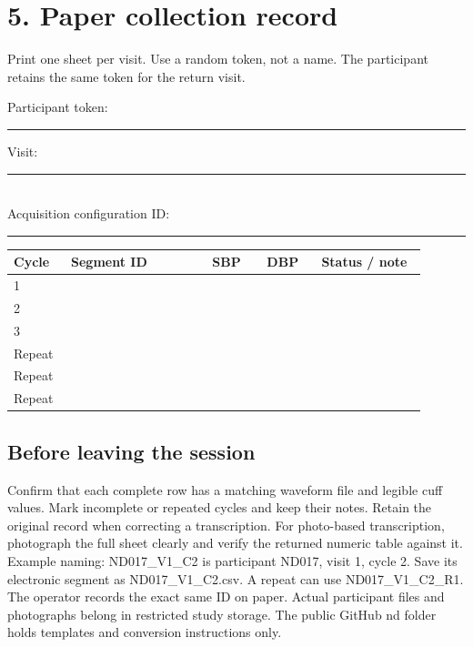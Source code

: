 \documentclass[11pt,letterpaper]{article}
\renewcommand{\arraystretch}{1.22}
\begin{document}
\section*{5. Paper collection record}
Print one sheet per visit. Use a random token, not a name. The participant retains the same token for the return visit.
\par
Participant token: \rule{4cm}{0.4pt} \quad Visit: \rule{1.5cm}{0.4pt}\\
Acquisition configuration ID: \rule{7cm}{0.4pt}
\vspace{8pt}
\renewcommand{\arraystretch}{2.7}

\par\smallskip
\begin{tabular}{@{}p{0.12\linewidth}p{0.31\linewidth}p{0.12\linewidth}p{0.12\linewidth}p{0.23\linewidth}@{}}\toprule
Cycle & Segment ID & SBP & DBP & Status / note\\\midrule
1 &  &  &  & \\
2 &  &  &  & \\
3 &  &  &  & \\
Repeat &  &  &  & \\
Repeat &  &  &  & \\
Repeat &  &  &  & \\
\bottomrule\end{tabular}\par\smallskip
\renewcommand{\arraystretch}{1.22}
\subsection*{Before leaving the session}
Confirm that each complete row has a matching waveform file and legible cuff values. Mark incomplete or repeated cycles and keep their notes. Retain the original record when correcting a transcription. For photo-based transcription, photograph the full sheet clearly and verify the returned numeric table against it.
Example naming: ND017\_V1\_C2 is participant ND017, visit 1, cycle 2. Save its electronic segment as ND017\_V1\_C2.csv. A repeat can use ND017\_V1\_C2\_R1. The operator records the exact same ID on paper.
Actual participant files and photographs belong in restricted study storage. The public GitHub nd folder holds templates and conversion instructions only.\newpage
\end{document}
